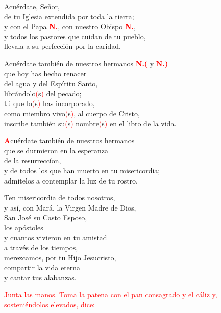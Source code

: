 \documentclass[12pt, letterpaper, spanish]{article}
\begin{document}
  \noindent
  Acu\'erdate, Se\~nor,\\
  de tu Iglesia extendida por toda la tierra; \\
  y con el Papa {\bfseries \textcolor{red}{N.}}, con nuestro Obispo {\bfseries \textcolor{red}{N.}},\\
  y todos los pastores que cuidan de tu pueblo,\\
  llevala a su perfecci\'on por la caridad.

  \noindent
  Acu\'erdate tambi\'en de nuestros hermanos {\bfseries \textcolor{red}{N.(}} y {\bfseries \textcolor{red}{N.)}} \\
  que hoy has hecho renacer \\
  del agua y del Esp\'iritu Santo, \\
  libr\'andolo\textcolor{red}{(}s\textcolor{red}{)} del pecado; \\
  t\'u que lo\textcolor{red}{(}s\textcolor{red}{)} has incorporado, \\
  como miembro vivo\textcolor{red}{(}s\textcolor{red}{)}, al cuerpo de Cristo, \\
  inscribe tambi\'en su\textcolor{red}{(}s\textcolor{red}{)} nombre\textcolor{red}{(}s\textcolor{red}{)} en el libro de la vida.

  \lettrine[lines=2]{\bfseries \textcolor{red}{A}}{}\Large cu\'erdate tambi\'en de nuestros hermanos\\
  que se durmieron en la esperanza\\
  de la resurrecc\'ion,\\
  y de todos los que han muerto en tu misericordia;\\
  admitelos a contemplar la luz de tu rostro.

  \noindent
  Ten misericordia de todos nosotros,\\
  y as\'i, con Mar\'a, la Virgen Madre de Dios,\\
  San Jos\'e su Casto Esposo, \\
  los ap\'ostoles\\
  y cuantos vivieron en tu amistad\\
  a trav\'es de los tiempos,\\
  merezcamos, por tu Hijo Jesucristo,\\
  compartir la vida eterna\\
  y cantar tus alabanzas. 

  \large{\textcolor{red}{Junta las manos. Toma la patena con el pan consagrado y el c\'aliz y, sosteni\'endolos elevados, dice:}}
  
\end{document}
